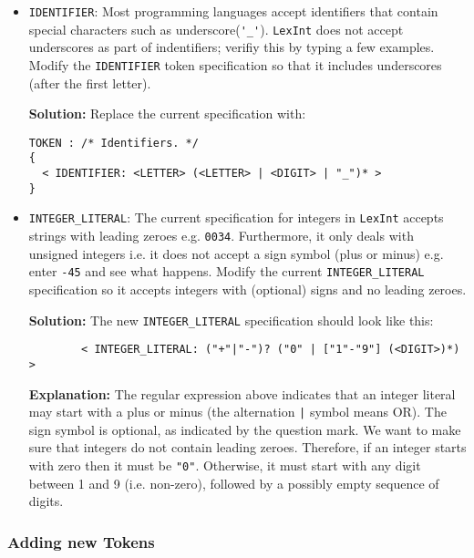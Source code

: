 \documentclass{article}
\begin{document}
\begin{itemize}
\item \verb+IDENTIFIER+: Most programming languages accept identifiers that contain special characters such as underscore(\verb+'_'+). {\tt LexInt} does not accept underscores as part of indentifiers; verifiy this by typing a few examples.  Modify the \verb+IDENTIFIER+ token specification so that it includes underscores (after the first letter).

\textbf{Solution:} Replace the current specification with:
\begin{verbatim}
TOKEN : /* Identifiers. */
{
  < IDENTIFIER: <LETTER> (<LETTER> | <DIGIT> | "_")* >
}
\end{verbatim}

\item \verb+INTEGER_LITERAL+: The current specification for integers in {\tt LexInt} accepts strings with leading zeroes e.g. \verb+0034+. Furthermore, it only deals with unsigned integers i.e. it does not accept a sign symbol (plus or minus) e.g. enter \verb+-45+ and see what happens. Modify the current \verb+INTEGER_LITERAL+ specification so it accepts integers with (optional) signs and no leading zeroes.

\textbf{Solution:} The new \verb+INTEGER_LITERAL+ specification should look like this:
\begin{verbatim}
        < INTEGER_LITERAL: ("+"|"-")? ("0" | ["1"-"9"] (<DIGIT>)*)  >
\end{verbatim} 


\textbf{Explanation:} The regular expression above indicates that an integer literal may start with a plus or minus (the alternation \verb+|+ symbol means OR). The sign symbol is optional, as indicated by the question mark. We want to make sure that integers do not contain leading zeroes. Therefore, if an integer starts with zero then it must be \verb+"0"+. Otherwise, it must start with any digit between 1 and 9 (i.e. non-zero), followed by a possibly empty sequence of digits.

\end{itemize}

\subsubsection*{Adding new Tokens}
\end{document}
